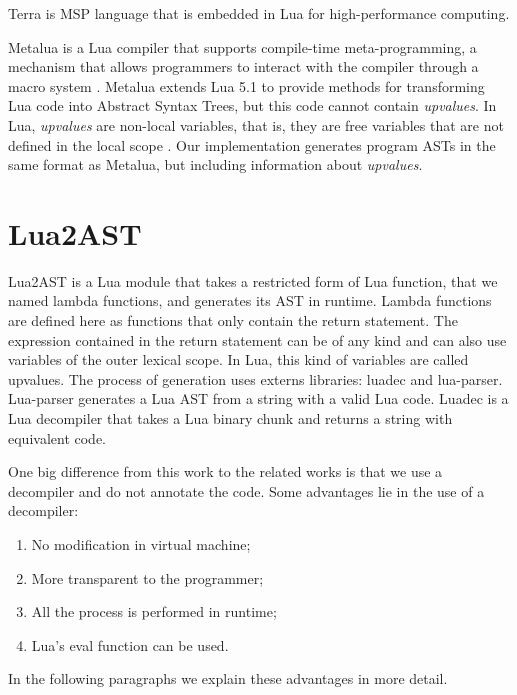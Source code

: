 \documentclass[english]{llncs}
\begin{document}
Terra \cite{DeVito2013Terra} is MSP language that is embedded in Lua
for high-performance computing.

Metalua \cite{metalua} is a Lua compiler that supports compile-time
meta-programming, a mechanism that allows programmers to interact
with the compiler through a macro system \cite{Fleutot2007contrasting}.
Metalua extends Lua 5.1 to provide methods for transforming Lua
code into Abstract Syntax Trees, but this code cannot contain
\emph{upvalues}.
In Lua, \emph{upvalues} are non-local variables, that is,
they are free variables that are not defined in the local scope \cite{Ierusalimschy2006PIL}.
Our implementation generates program ASTs in the same format as
Metalua, but including information about \emph{upvalues}.

\section{Lua2AST}
\label{sec:lua2ast}

Lua2AST is a Lua module that takes a restricted form of Lua function, that we named lambda functions, and generates its AST in runtime.
Lambda functions are defined here as functions that only contain the return statement.
The expression contained in the return statement can be of any kind and can also use variables of the outer lexical scope.
In Lua, this kind of variables are called upvalues.
The process of generation uses externs libraries: luadec and lua-parser.
Lua-parser \cite{lua-parser} generates a Lua AST from a string with a valid Lua code.
Luadec \cite{luadec} is a Lua decompiler that takes a Lua binary chunk and returns a string with equivalent code.

One big difference from this work to the related works is that we use a decompiler and do not annotate the code.
Some advantages lie in the use of a decompiler: 
\begin{enumerate}
\item No modification in virtual machine; 
\item More transparent to the programmer; 
\item All the process is performed in runtime;
\item Lua's eval function can be used.
\end{enumerate}
In the following paragraphs we explain these advantages in more detail.
\end{document}
